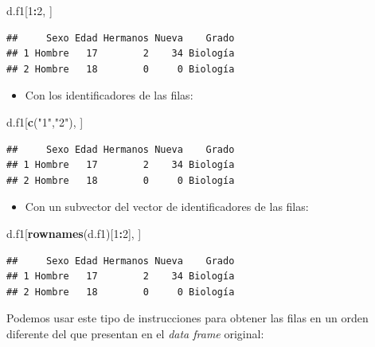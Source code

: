 \documentclass[]{book}
\newenvironment{Shaded}{\begin{snugshade}}{\end{snugshade}}
\newcommand{\DecValTok}[1]{\textcolor[rgb]{0.00,0.00,0.81}{#1}}
\newcommand{\KeywordTok}[1]{\textcolor[rgb]{0.13,0.29,0.53}{\textbf{#1}}}
\newcommand{\NormalTok}[1]{#1}
\newcommand{\OperatorTok}[1]{\textcolor[rgb]{0.81,0.36,0.00}{\textbf{#1}}}
\newcommand{\StringTok}[1]{\textcolor[rgb]{0.31,0.60,0.02}{#1}}
\providecommand{\tightlist}{%
  \setlength{\itemsep}{0pt}\setlength{\parskip}{0pt}}
\theoremstyle{definition}
\theoremstyle{definition}
\theoremstyle{definition}
\theoremstyle{remark}
\begin{document}
\begin{Shaded}
\begin{Highlighting}[]
\NormalTok{d.f1[}\DecValTok{1}\OperatorTok{:}\DecValTok{2}\NormalTok{, ]}
\end{Highlighting}
\end{Shaded}

\begin{verbatim}
##     Sexo Edad Hermanos Nueva    Grado
## 1 Hombre   17        2    34 Biología
## 2 Hombre   18        0     0 Biología
\end{verbatim}

\begin{itemize}
\tightlist
\item
  Con los identificadores de las filas:
\end{itemize}

\begin{Shaded}
\begin{Highlighting}[]
\NormalTok{d.f1[}\KeywordTok{c}\NormalTok{(}\StringTok{"1"}\NormalTok{,}\StringTok{"2"}\NormalTok{), ] }
\end{Highlighting}
\end{Shaded}

\begin{verbatim}
##     Sexo Edad Hermanos Nueva    Grado
## 1 Hombre   17        2    34 Biología
## 2 Hombre   18        0     0 Biología
\end{verbatim}

\begin{itemize}
\tightlist
\item
  Con un subvector del vector de identificadores de las filas:
\end{itemize}

\begin{Shaded}
\begin{Highlighting}[]
\NormalTok{d.f1[}\KeywordTok{rownames}\NormalTok{(d.f1)[}\DecValTok{1}\OperatorTok{:}\DecValTok{2}\NormalTok{], ]}
\end{Highlighting}
\end{Shaded}

\begin{verbatim}
##     Sexo Edad Hermanos Nueva    Grado
## 1 Hombre   17        2    34 Biología
## 2 Hombre   18        0     0 Biología
\end{verbatim}

Podemos usar este tipo de instrucciones para obtener las filas en un orden diferente del que presentan en el \emph{data frame} original:
\end{document}
